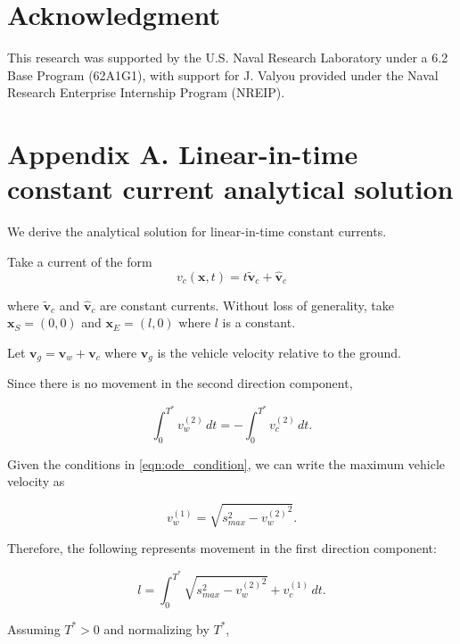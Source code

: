 \documentclass[pdflatex,sn-mathphys-num]{sn-jnl}%
\def \bx{{\mathbf {x}}}
\def \bv{{\mathbf {v}}}
\theoremstyle{thmstyleone}%
\theoremstyle{thmstyletwo}%
\theoremstyle{thmstylethree}%
\begin{document}
\section*{Acknowledgment}

This research was supported by the U.S. Naval Research Laboratory under a 6.2 Base Program (62A1G1), with support for J. Valyou provided under the Naval Research Enterprise Internship Program (NREIP).  





\section*{Appendix A. Linear-in-time constant current analytical solution}
\label{sec:app}

We derive the analytical solution for linear-in-time constant currents.

Take a current of the form 
\begin{equation}
    v_c(\bx,t)=t\tilde{\bv}_c + \hat{\bv}_c
    \label{eq:linearintime}
\end{equation}

where $\tilde{\bv}_c$ and $\hat{\bv}_c$ are constant currents.  Without loss of generality, take $\bx_S=(0,0)$ and $\bx_E=(l,0)$ where $l$ is a constant.

Let $\bv_g = \bv_w + \bv_c$ where $\bv_g$ is the vehicle velocity relative to the ground.

Since there is no movement in the second direction component,

\begin{equation}
    \int_{0}^{T^*} v_{w}^{(2)} \,dt = - \int_{0}^{T^*} v_{c}^{(2)} \,dt.
    \label{eq:inteq}
\end{equation}

Given the conditions in \eqref{eqn:ode_condition}, we can write the maximum vehicle velocity as

\begin{equation}
    v_{w}^{(1)} = \sqrt{s_{max}^2 - {v_{w}^{(2)}}^2}.\end{equation}
    
Therefore, the following represents movement in the first direction component:

\begin{equation}
    l = \int_{0}^{T^*} \sqrt{s_{max}^2 - {v_{w}^{(2)}}^2} + v_{c}^{(1)} \,dt.
\end{equation}

Assuming $T^*>0$ and normalizing by $T^*$,
\end{document}
